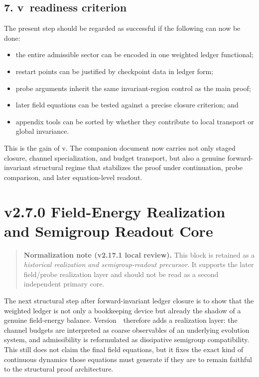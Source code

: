 \subsection*{7. v\docversion\ readiness criterion}
The present step should be regarded as successful if the following can now be done:
\begin{itemize}
  \item the entire admissible sector can be encoded in one weighted ledger functional;
  \item restart points can be justified by checkpoint data in ledger form;
  \item probe arguments inherit the same invariant-region control as the main proof;
  \item later field equations can be tested against a precise closure criterion; and
  \item appendix tools can be sorted by whether they contribute to local transport or global invariance.
\end{itemize}

This is the gain of v\docversion. The companion document now carries not only staged
closure, channel specialization, and budget transport, but also a genuine
forward-invariant structural regime that stabilizes the proof under continuation,
probe comparison, and later equation-level readout.


\section*{v2.7.0 Field-Energy Realization and Semigroup Readout Core}

\begin{quote}
\textbf{Normalization note (v2.17.1 local review).}
This block is retained as a \emph{historical realization and semigroup-readout precursor}. It supports the later field/probe realization layer and should not be read as a second independent primary core.
\end{quote}

The next structural step after forward-invariant ledger closure is to show that the
weighted ledger is not only a bookkeeping device but already the shadow of a genuine
field-energy balance. Version~\docversion\ therefore adds a realization layer: the
channel budgets are interpreted as coarse observables of an underlying evolution
system, and admissibility is reformulated as dissipative semigroup compatibility.
This still does not claim the final field equations, but it fixes the exact kind of
continuous dynamics those equations must generate if they are to remain faithful to
the structural proof architecture.

